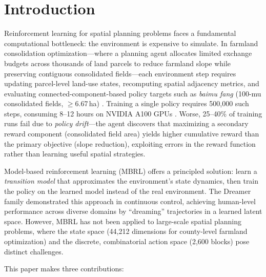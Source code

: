 \documentclass[11pt]{article}
\begin{document}
\section{Introduction}
\label{sec:intro}

Reinforcement learning for spatial planning problems faces a fundamental computational bottleneck: the environment is expensive to simulate. In farmland consolidation optimization---where a planning agent allocates limited exchange budgets across thousands of land parcels to reduce farmland slope while preserving contiguous consolidated fields---each environment step requires updating parcel-level land-use states, recomputing spatial adjacency metrics, and evaluating connected-component-based policy targets such as \textit{baimu fang} (100-mu consolidated fields, $\geq$6.67\,ha) \citep{zhou2026block}. Training a single policy requires 500{,}000 such steps, consuming 8--12 hours on NVIDIA A100 GPUs \citep{zhou2026county}. Worse, 25--40\% of training runs fail due to \textit{policy drift}---the agent discovers that maximizing a secondary reward component (consolidated field area) yields higher cumulative reward than the primary objective (slope reduction), exploiting errors in the reward function rather than learning useful spatial strategies.

Model-based reinforcement learning (MBRL) offers a principled solution: learn a \textit{transition model} that approximates the environment's state dynamics, then train the policy on the learned model instead of the real environment. The Dreamer family \citep{hafner2023dreamerv3} demonstrated this approach in continuous control, achieving human-level performance across diverse domains by ``dreaming'' trajectories in a learned latent space. However, MBRL has not been applied to large-scale spatial planning problems, where the state space (44{,}212 dimensions for county-level farmland optimization) and the discrete, combinatorial action space (2{,}600 blocks) pose distinct challenges.

This paper makes three contributions:
\end{document}
